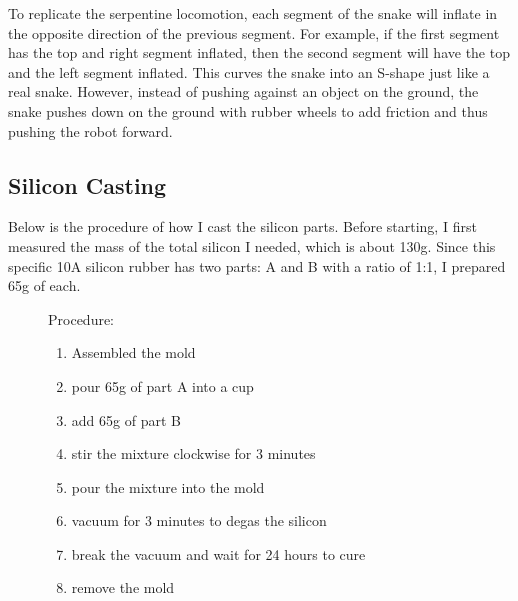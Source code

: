 \documentclass[twoside, 11pt]{article}
\begin{document}
To replicate the serpentine locomotion, each segment of the snake will inflate in the opposite direction of the previous segment. For example, if the first segment has the top and right segment inflated, then the second segment will have the top and the left segment  inflated. This curves the snake into an S-shape just like a real snake. However, instead of pushing against an object on the ground, the snake pushes down on the ground with rubber wheels to add friction and thus pushing the robot forward. 

\subsection{Silicon Casting}
Below is the procedure of how I cast the silicon parts. Before starting, I first measured the mass of the total silicon I needed, which is about 130g. Since this specific 10A silicon rubber has two parts: A and B with a ratio of 1:1, I prepared 65g of each. 
\begin{figure} [H]
	\setlength\itemsep{-8pt}
	Procedure:
	\begin{enumerate}
 		\item Assembled the mold
 		\item pour 65g of part A into a cup
 		\item add 65g of part B
 		\item stir the mixture clockwise for 3 minutes
 		\item pour the mixture into the mold
 		\item vacuum for 3 minutes to degas the silicon
 		\item break the vacuum and wait for 24 hours to cure
 		\item remove the mold
	\end{enumerate}
\end{figure}
\end{document}
